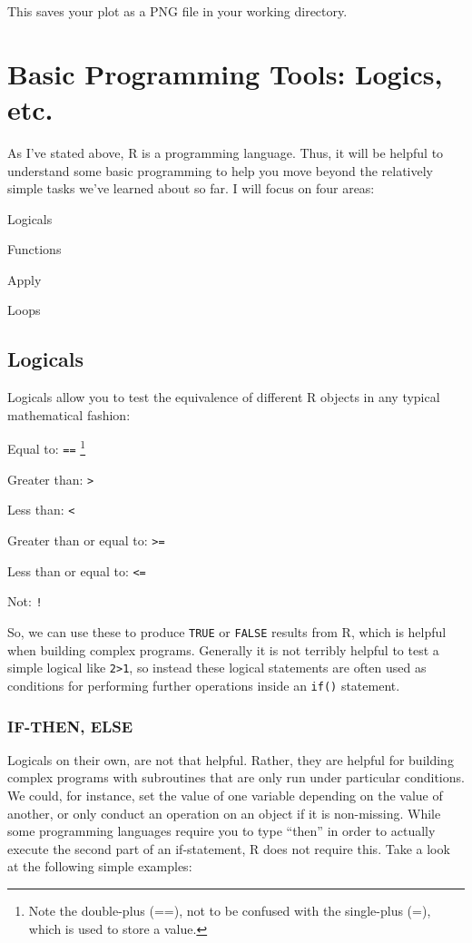 \documentclass[12pt]{article}\usepackage[]{graphicx}\usepackage[]{color}
\begin{document}
\noindent This saves your plot as a PNG file in your working directory.

\section{Basic Programming Tools: Logics, etc.}\label{sec:programming}
As I've stated above, R is a programming language. Thus, it will be helpful to understand some basic programming to help you move beyond the relatively simple tasks we've learned about so far. I will focus on four areas:
\begin{enumerate*}
\item Logicals
\item Functions
\item Apply
\item Loops
\end{enumerate*}

\subsection{Logicals}
Logicals allow you to test the equivalence of different R objects in any typical mathematical fashion:
\begin{itemize*}
\item Equal to: \texttt{==} \footnote{Note the double-plus (==), not to be confused with the single-plus (=), which is used to store a value.}
\item Greater than: \texttt{>}
\item Less than: \texttt{<}
\item Greater than or equal to: \texttt{>=}
\item Less than or equal to: \texttt{<=}
\item Not: \texttt{!}
\end{itemize*}
So, we can use these to produce \texttt{TRUE} or \texttt{FALSE} results from R, which is helpful when building complex programs. Generally it is not terribly helpful to test a simple logical like \texttt{2>1}, so instead these logical statements are often used as conditions for performing further operations inside an \texttt{if()} statement.

\subsubsection{IF-THEN, ELSE}
Logicals on their own, are not that helpful. Rather, they are helpful for building complex programs with subroutines that are only run under particular conditions. We could, for instance, set the value of one variable depending on the value of another, or only conduct an operation on an object if it is non-missing. While some programming languages require you to type ``then'' in order to actually execute the second part of an if-statement, R does not require this. Take a look at the following simple examples:
\end{document}
